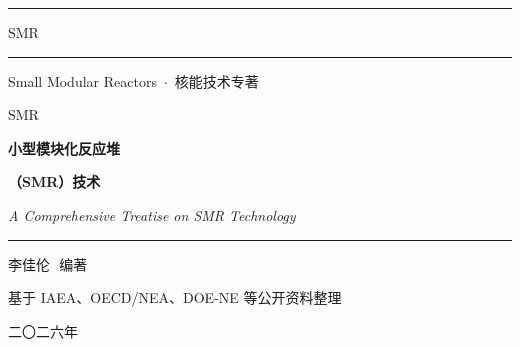 
\begin{titlepage}
\thispagestyle{empty}
\pagecolor{qianhui!30}

\vspace*{28mm}
\noindent
\hfill\textcolor{zhusha}{\rule{40mm}{1pt}}\hspace{4mm}\textsf{SMR}\hspace{4mm}\textcolor{zhusha}{\rule{40mm}{1pt}}

\vspace{4mm}
\begin{center}
{\small\color{shenhui}Small Modular Reactors \,$\cdot$\, 核能技术专著}
\end{center}

\vspace{48mm}

\begin{center}
{\color{zhusha}\Huge\heiti SMR}

\vspace{10mm}

{\Huge\bfseries 小型模块化反应堆}

\vspace{6mm}

{\LARGE\bfseries （SMR）技术}

\vspace{10mm}

{\large\itshape\color{shenhui} A Comprehensive Treatise on SMR Technology}
\end{center}

\vfill

\vspace{30mm}
\begin{center}
\textcolor{zhusha}{\rule{60mm}{0.4pt}}

\vspace{6mm}
{\Large 李佳伦\,\, 编著}

\vspace{4mm}
{\small\color{shenhui} 基于 IAEA、OECD/NEA、DOE-NE 等公开资料整理}

\vspace{14mm}
{\large 二〇二六年}
\end{center}

\vspace{14mm}

\clearpage
\nopagecolor
\end{titlepage}
